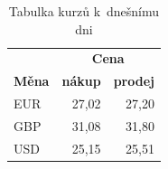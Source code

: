 \documentclass[11pt, a4paper]{article}
\begin{document}
\begin{table}[h] 
 \begin{center}
 \begin{tabular}{|l|r|r|}
  \hline
  & \multicolumn{2}{|c|}{\bfseries Cena}\\ \cline{2-3}
  \bfseries Měna & \bfseries nákup & \bfseries prodej\\ \hline
  EUR & 27,02 & 27,20 \\
  GBP & 31,08 & 31,80 \\
  USD & 25,15 & 25,51 \\
  \hline
  \end{tabular}
  \\[10pt]
  \end{center} 
 \caption{Tabulka kurzů k~dnešnímu dni} 
 \label{tab:tab1}
\end{table}
\end{document}

